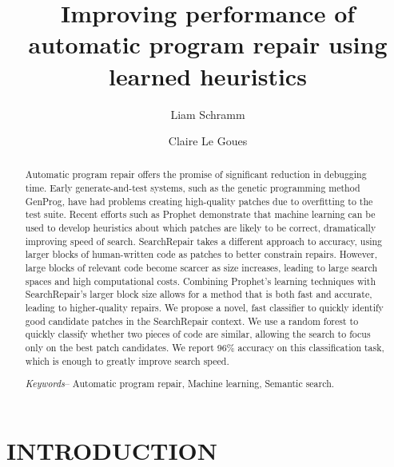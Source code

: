 \documentclass[conference]{IEEEtran}
\title{\LARGE \bf
Improving performance of automatic program repair using learned heuristics
}
\author{Liam Schramm}
\affil{Bard College}
\author{Claire Le Goues}
\affil{Carnegie Melon University}
\begin{document}
\maketitle
\thispagestyle{empty}
\pagestyle{empty}


\begin{abstract}

Automatic program repair offers the promise of significant reduction in debugging time. 
Early generate-and-test systems, such as the genetic programming method GenProg, have had problems creating high-quality patches due to overfitting to the test suite. 
Recent efforts such as Prophet demonstrate that machine learning can be used to develop heuristics about which patches are likely to be correct, dramatically improving speed of search. SearchRepair takes a different approach to accuracy, using larger blocks of human-written code as patches to better constrain repairs. 
However, large blocks of relevant code become scarcer as size increases, leading to large search spaces and high computational costs. 
Combining Prophet's learning techniques with SearchRepair's larger block size allows for a method that is both fast and accurate, leading to higher-quality repairs. 
We propose a novel, fast classifier to quickly identify good candidate patches in the SearchRepair context. 
We use a random forest to quickly classify whether two pieces of code are similar, allowing the search to focus only on the best patch candidates. We report 96\% accuracy on this classification task, which is enough to greatly improve search speed.


\textit{Keywords}-- Automatic program repair, Machine learning, Semantic search.


\end{abstract}




\section{INTRODUCTION}
\end{document}
